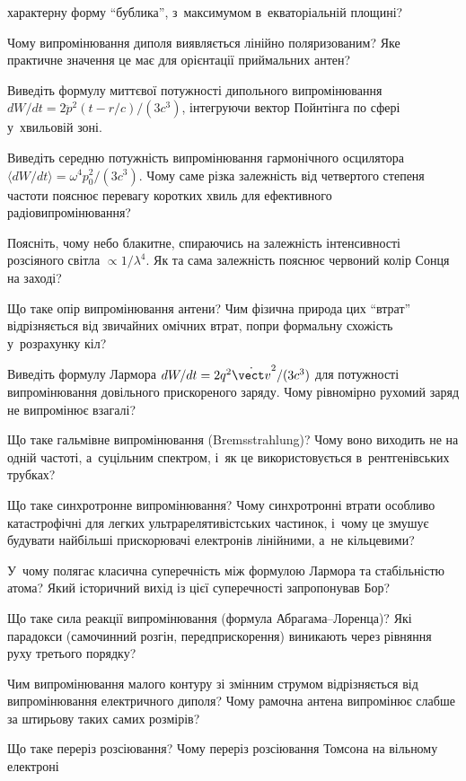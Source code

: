 \begin{Questions}
\begin{quizlist}
	  характерну форму \enquote{бублика}, з~максимумом в~екваторіальній площині?
	\item Чому випромінювання диполя виявляється лінійно поляризованим? Яке практичне
	  значення це має для орієнтації приймальних антен?
	\item Виведіть формулу миттєвої потужності дипольного випромінювання $dW/dt = 2\ddot{p}^2(t-r/c)/(3c^3)$, інтегруючи вектор Пойнтінга по сфері у~хвильовій зоні.
	\item Виведіть середню потужність випромінювання гармонічного осцилятора $\langle
	  dW/dt\rangle = \omega^4p_0^2/(3c^3)$. Чому саме різка залежність від четвертого
	  степеня частоти пояснює перевагу коротких хвиль для ефективного радіовипромінювання?
	\item Поясніть, чому небо блакитне, спираючись на залежність інтенсивності розсіяного
	  світла $\propto1/\lambda^4$. Як та сама залежність пояснює червоний колір Сонця на
	  заході?
	\item Що таке опір випромінювання антени? Чим фізична природа цих \enquote{втрат}
	  відрізняється від звичайних омічних втрат, попри формальну схожість у~розрахунку
	  кіл?
	\item Виведіть формулу Лармора $dW/dt = 2q^2\dot{\vect v}^2/(3c^3)$ для потужності
	  випромінювання довільного прискореного заряду. Чому рівномірно рухомий заряд не
	  випромінює взагалі?
	\item Що таке гальмівне випромінювання (Bremsstrahlung)? Чому воно виходить не на
	  одній частоті, а~суцільним спектром, і~як це використовується в~рентгенівських
	  трубках?
	\item Що таке синхротронне випромінювання? Чому синхротронні втрати особливо
	  катастрофічні для легких ультрарелятивістських частинок, і~чому це змушує будувати
	  найбільші прискорювачі електронів лінійними, а~не кільцевими?
	\item У~чому полягає класична суперечність між формулою Лармора та стабільністю атома?
	  Який історичний вихід із цієї суперечності запропонував Бор?
	\item Що таке сила реакції випромінювання (формула Абрагама--Лоренца)? Які парадокси
	  (самочинний розгін, передприскорення) виникають через рівняння руху третього порядку?
	\item Чим випромінювання малого контуру зі змінним струмом відрізняється від
	  випромінювання електричного диполя? Чому рамочна антена випромінює слабше за штирьову
	  таких самих розмірів?
	\item Що таке переріз розсіювання? Чому переріз розсіювання Томсона на вільному електроні

\end{quizlist}
\end{Questions}
